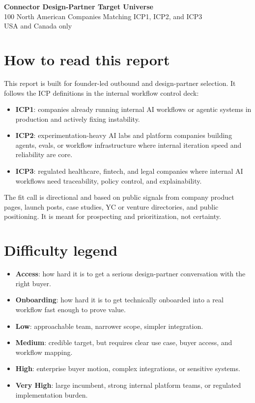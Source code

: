 \documentclass[11pt]{article}
\begin{document}
\small
\begin{center}
{\LARGE \textbf{Connector Design-Partner Target Universe}}\\[0.3em]
{\large 100 North American Companies Matching ICP1, ICP2, and ICP3}\\[0.4em]
{\normalsize USA and Canada only}
\end{center}

\section{How to read this report}
This report is built for founder-led outbound and design-partner selection. It follows the ICP definitions in the internal workflow control deck:
\begin{itemize}
\item \textbf{ICP1}: companies already running internal AI workflows or agentic systems in production and actively fixing instability.
\item \textbf{ICP2}: experimentation-heavy AI labs and platform companies building agents, evals, or workflow infrastructure where internal iteration speed and reliability are core.
\item \textbf{ICP3}: regulated healthcare, fintech, and legal companies where internal AI workflows need traceability, policy control, and explainability.
\end{itemize}
The fit call is directional and based on public signals from company product pages, launch posts, case studies, YC or venture directories, and public positioning. It is meant for prospecting and prioritization, not certainty.

\section{Difficulty legend}
\begin{itemize}
\item \textbf{Access}: how hard it is to get a serious design-partner conversation with the right buyer.
\item \textbf{Onboarding}: how hard it is to get technically onboarded into a real workflow fast enough to prove value.
\item \textbf{Low}: approachable team, narrower scope, simpler integration.
\item \textbf{Medium}: credible target, but requires clear use case, buyer access, and workflow mapping.
\item \textbf{High}: enterprise buyer motion, complex integrations, or sensitive systems.
\item \textbf{Very High}: large incumbent, strong internal platform teams, or regulated implementation burden.
\end{itemize}
\end{document}
